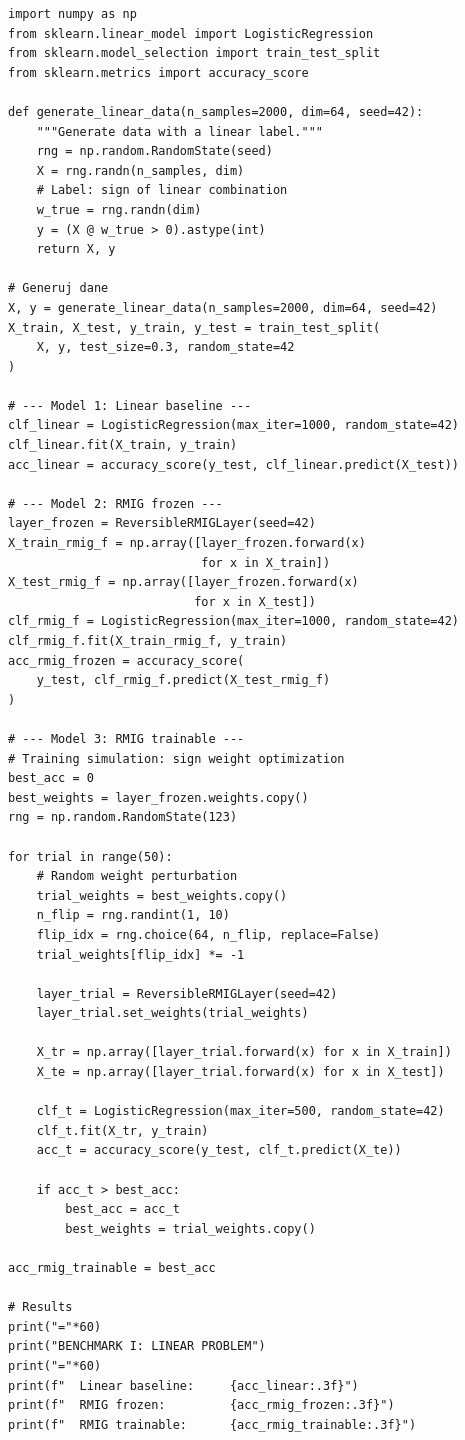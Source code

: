 \documentclass[11pt,a4paper]{report}
\begin{document}
\label{app:ch2-lst5}
\begin{lstlisting}[caption={Benchmark I --- linear problem}]
import numpy as np
from sklearn.linear_model import LogisticRegression
from sklearn.model_selection import train_test_split
from sklearn.metrics import accuracy_score

def generate_linear_data(n_samples=2000, dim=64, seed=42):
    """Generate data with a linear label."""
    rng = np.random.RandomState(seed)
    X = rng.randn(n_samples, dim)
    # Label: sign of linear combination
    w_true = rng.randn(dim)
    y = (X @ w_true > 0).astype(int)
    return X, y

# Generuj dane
X, y = generate_linear_data(n_samples=2000, dim=64, seed=42)
X_train, X_test, y_train, y_test = train_test_split(
    X, y, test_size=0.3, random_state=42
)

# --- Model 1: Linear baseline ---
clf_linear = LogisticRegression(max_iter=1000, random_state=42)
clf_linear.fit(X_train, y_train)
acc_linear = accuracy_score(y_test, clf_linear.predict(X_test))

# --- Model 2: RMIG frozen ---
layer_frozen = ReversibleRMIGLayer(seed=42)
X_train_rmig_f = np.array([layer_frozen.forward(x) 
                           for x in X_train])
X_test_rmig_f = np.array([layer_frozen.forward(x) 
                          for x in X_test])
clf_rmig_f = LogisticRegression(max_iter=1000, random_state=42)
clf_rmig_f.fit(X_train_rmig_f, y_train)
acc_rmig_frozen = accuracy_score(
    y_test, clf_rmig_f.predict(X_test_rmig_f)
)

# --- Model 3: RMIG trainable ---
# Training simulation: sign weight optimization
best_acc = 0
best_weights = layer_frozen.weights.copy()
rng = np.random.RandomState(123)

for trial in range(50):
    # Random weight perturbation
    trial_weights = best_weights.copy()
    n_flip = rng.randint(1, 10)
    flip_idx = rng.choice(64, n_flip, replace=False)
    trial_weights[flip_idx] *= -1
    
    layer_trial = ReversibleRMIGLayer(seed=42)
    layer_trial.set_weights(trial_weights)
    
    X_tr = np.array([layer_trial.forward(x) for x in X_train])
    X_te = np.array([layer_trial.forward(x) for x in X_test])
    
    clf_t = LogisticRegression(max_iter=500, random_state=42)
    clf_t.fit(X_tr, y_train)
    acc_t = accuracy_score(y_test, clf_t.predict(X_te))
    
    if acc_t > best_acc:
        best_acc = acc_t
        best_weights = trial_weights.copy()

acc_rmig_trainable = best_acc

# Results
print("="*60)
print("BENCHMARK I: LINEAR PROBLEM")
print("="*60)
print(f"  Linear baseline:     {acc_linear:.3f}")
print(f"  RMIG frozen:         {acc_rmig_frozen:.3f}")
print(f"  RMIG trainable:      {acc_rmig_trainable:.3f}")
\end{lstlisting}
\end{document}
